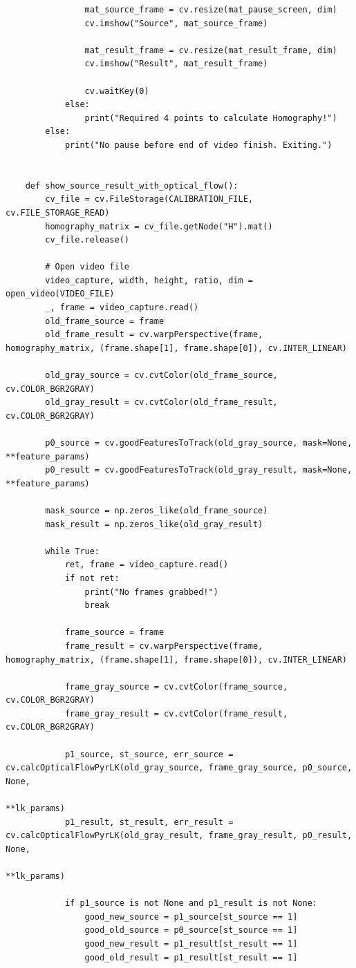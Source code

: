 \documentclass[a4paper,12pt]{article}
\begin{document}
\begin{lstlisting}
				mat_source_frame = cv.resize(mat_pause_screen, dim)
				cv.imshow("Source", mat_source_frame)
	
				mat_result_frame = cv.resize(mat_result_frame, dim)
				cv.imshow("Result", mat_result_frame)
	
				cv.waitKey(0)
			else:
				print("Required 4 points to calculate Homography!")
		else:
			print("No pause before end of video finish. Exiting.")
	
	
	def show_source_result_with_optical_flow():
		cv_file = cv.FileStorage(CALIBRATION_FILE, cv.FILE_STORAGE_READ)
		homography_matrix = cv_file.getNode("H").mat()
		cv_file.release()
	
		# Open video file
		video_capture, width, height, ratio, dim = open_video(VIDEO_FILE)
		_, frame = video_capture.read()
		old_frame_source = frame
		old_frame_result = cv.warpPerspective(frame, homography_matrix, (frame.shape[1], frame.shape[0]), cv.INTER_LINEAR)
	
		old_gray_source = cv.cvtColor(old_frame_source, cv.COLOR_BGR2GRAY)
		old_gray_result = cv.cvtColor(old_frame_result, cv.COLOR_BGR2GRAY)
	
		p0_source = cv.goodFeaturesToTrack(old_gray_source, mask=None, **feature_params)
		p0_result = cv.goodFeaturesToTrack(old_gray_result, mask=None, **feature_params)
	
		mask_source = np.zeros_like(old_frame_source)
		mask_result = np.zeros_like(old_gray_result)
	
		while True:
			ret, frame = video_capture.read()
			if not ret:
				print("No frames grabbed!")
				break
	
			frame_source = frame
			frame_result = cv.warpPerspective(frame, homography_matrix, (frame.shape[1], frame.shape[0]), cv.INTER_LINEAR)
	
			frame_gray_source = cv.cvtColor(frame_source, cv.COLOR_BGR2GRAY)
			frame_gray_result = cv.cvtColor(frame_result, cv.COLOR_BGR2GRAY)
	
			p1_source, st_source, err_source = cv.calcOpticalFlowPyrLK(old_gray_source, frame_gray_source, p0_source, None,
																	   **lk_params)
			p1_result, st_result, err_result = cv.calcOpticalFlowPyrLK(old_gray_result, frame_gray_result, p0_result, None,
																	   **lk_params)
	
			if p1_source is not None and p1_result is not None:
				good_new_source = p1_source[st_source == 1]
				good_old_source = p0_source[st_source == 1]
				good_new_result = p1_result[st_result == 1]
				good_old_result = p1_result[st_result == 1]
	

\end{lstlisting}
\end{document}

